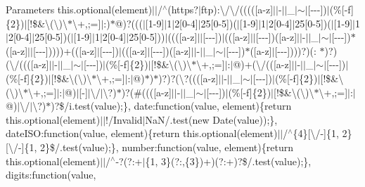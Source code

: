 \begin{DoxyParams}{Parameters}
this.\+optional(element)$\vert$$\vert$/$^\wedge$(https?$\vert$ftp)\+:\textbackslash{}/\textbackslash{}/((((\mbox{[}a-\/z\mbox{]}$\vert$$\vert$-\/$\vert$$\vert$\+\_\+$\vert$$\sim$$\vert$\mbox{[}-\/-\/-\/\mbox{]})$\vert$(\%\mbox{[}-\/f\mbox{]}\{2\})$\vert$\mbox{[}!\$\&\textquotesingle{}\textbackslash{}(\textbackslash{})\textbackslash{}$\ast$\textbackslash{}+,;=\mbox{]}$\vert$\+:)$\ast$@)?((($\vert$\mbox{[}1-\/9\mbox{]}$\vert$1$\vert$2\mbox{[}0-\/4\mbox{]}$\vert$25\mbox{[}0-\/5\mbox{]})($\vert$\mbox{[}1-\/9\mbox{]}$\vert$1$\vert$2\mbox{[}0-\/4\mbox{]}$\vert$25\mbox{[}0-\/5\mbox{]})($\vert$\mbox{[}1-\/9\mbox{]}$\vert$1$\vert$2\mbox{[}0-\/4\mbox{]}$\vert$25\mbox{[}0-\/5\mbox{]})($\vert$\mbox{[}1-\/9\mbox{]}$\vert$1$\vert$2\mbox{[}0-\/4\mbox{]}$\vert$25\mbox{[}0-\/5\mbox{]}))$\vert$(((\mbox{[}a-\/z\mbox{]}$\vert$$\vert$\mbox{[}-\/-\/-\/\mbox{]})$\vert$((\mbox{[}a-\/z\mbox{]}$\vert$$\vert$\mbox{[}-\/-\/-\/\mbox{]})(\mbox{[}a-\/z\mbox{]}$\vert$$\vert$-\/$\vert$$\vert$\+\_\+$\vert$$\sim$$\vert$\mbox{[}-\/-\/-\/\mbox{]})$\ast$(\mbox{[}a-\/z\mbox{]}$\vert$$\vert$\mbox{[}-\/-\/-\/\mbox{]}))))+((\mbox{[}a-\/z\mbox{]}$\vert$\mbox{[}-\/-\/-\/\mbox{]})$\vert$((\mbox{[}a-\/z\mbox{]}$\vert$\mbox{[}-\/-\/-\/\mbox{]})(\mbox{[}a-\/z\mbox{]}$\vert$$\vert$-\/$\vert$$\vert$\+\_\+$\vert$$\sim$$\vert$\mbox{[}-\/-\/-\/\mbox{]})$\ast$(\mbox{[}a-\/z\mbox{]}$\vert$\mbox{[}-\/-\/-\/\mbox{]})))?)(\+: $\ast$)?)(\textbackslash{}/(((\mbox{[}a-\/z\mbox{]}$\vert$$\vert$-\/$\vert$$\vert$\+\_\+$\vert$$\sim$$\vert$\mbox{[}-\/-\/-\/\mbox{]})$\vert$(\%\mbox{[}-\/f\mbox{]}\{2\})$\vert$\mbox{[}!\$\&\textquotesingle{}\textbackslash{}(\textbackslash{})\textbackslash{}$\ast$\textbackslash{}+,;=\mbox{]}$\vert$\+:$\vert$@)+(\textbackslash{}/((\mbox{[}a-\/z\mbox{]}$\vert$$\vert$-\/$\vert$$\vert$\+\_\+$\vert$$\sim$$\vert$\mbox{[}-\/-\/-\/\mbox{]})$\vert$(\%\mbox{[}-\/f\mbox{]}\{2\})$\vert$\mbox{[}!\$\&\textquotesingle{}\textbackslash{}(\textbackslash{})\textbackslash{}$\ast$\textbackslash{}+,;=\mbox{]}$\vert$\+:$\vert$@)$\ast$)$\ast$)?)?(\textbackslash{}?(((\mbox{[}a-\/z\mbox{]}$\vert$$\vert$-\/$\vert$$\vert$\+\_\+$\vert$$\sim$$\vert$\mbox{[}-\/-\/-\/\mbox{]})$\vert$(\%\mbox{[}-\/f\mbox{]}\{2\})$\vert$\mbox{[}!\$\&\textquotesingle{}\textbackslash{}(\textbackslash{})\textbackslash{}$\ast$\textbackslash{}+,;=\mbox{]}$\vert$\+:$\vert$@)$\vert$\mbox{[}-\/\mbox{]}$\vert$\textbackslash{}/$\vert$\textbackslash{}?)$\ast$)?(\#(((\mbox{[}a-\/z\mbox{]}$\vert$$\vert$-\/$\vert$$\vert$\+\_\+$\vert$$\sim$$\vert$\mbox{[}-\/-\/-\/\mbox{]})$\vert$(\%\mbox{[}-\/f\mbox{]}\{2\})$\vert$\mbox{[}!\$\&\textquotesingle{}\textbackslash{}(\textbackslash{})\textbackslash{}$\ast$\textbackslash{}+,;=\mbox{]}$\vert$\+:$\vert$@)$\vert$\textbackslash{}/$\vert$\textbackslash{}?)$\ast$)?\$/i.test(value);\}, date\+:function(value, element)\{return this.\+optional(element)$\vert$$\vert$!/\+Invalid$\vert$\+Na\+N/.test(new Date(value));\}, date\+I\+S\+O\+:function(value, element)\{return this.\+optional(element)$\vert$$\vert$/$^\wedge$\{4\}\mbox{[}\textbackslash{}/-\/\mbox{]}\{1, 2\}\mbox{[}\textbackslash{}/-\/\mbox{]}\{1, 2\}\$/.test(value);\}, number\+:function(value, element)\{return this.\+optional(element)$\vert$$\vert$/$^\wedge$-\/?(?\+:+$\vert$\{1, 3\}(?\+:,\{3\})+)(?\+:+)?\$/.test(value);\}, digits\+:function(value, 
\end{DoxyParams}
